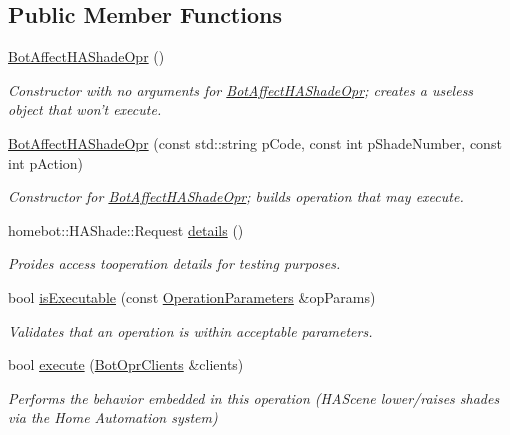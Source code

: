 \subsection*{Public Member Functions}
\begin{DoxyCompactItemize}
\item 
\hypertarget{classBotAffectHAShadeOpr_afb5fe3fd27fb2c560d880091418b753f}{\hyperlink{classBotAffectHAShadeOpr_afb5fe3fd27fb2c560d880091418b753f}{Bot\-Affect\-H\-A\-Shade\-Opr} ()}\label{classBotAffectHAShadeOpr_afb5fe3fd27fb2c560d880091418b753f}

\begin{DoxyCompactList}\small\item\em Constructor with no arguments for \hyperlink{classBotAffectHAShadeOpr}{Bot\-Affect\-H\-A\-Shade\-Opr}; creates a useless object that won't execute. \end{DoxyCompactList}\item 
\hyperlink{classBotAffectHAShadeOpr_a84f68ccbc995adb8bcb8bb06c2c615ee}{Bot\-Affect\-H\-A\-Shade\-Opr} (const std\-::string p\-Code, const int p\-Shade\-Number, const int p\-Action)
\begin{DoxyCompactList}\small\item\em Constructor for \hyperlink{classBotAffectHAShadeOpr}{Bot\-Affect\-H\-A\-Shade\-Opr}; builds operation that may execute. \end{DoxyCompactList}\item 
homebot\-::\-H\-A\-Shade\-::\-Request \hyperlink{classBotAffectHAShadeOpr_a45e3809806091e342492d66e8fade1a6}{details} ()
\begin{DoxyCompactList}\small\item\em Proides access tooperation details for testing purposes. \end{DoxyCompactList}\item 
bool \hyperlink{classBotAffectHAShadeOpr_af37862e410311c38fd41994c51138cf6}{is\-Executable} (const \hyperlink{classOperationParameters}{Operation\-Parameters} \&op\-Params)
\begin{DoxyCompactList}\small\item\em Validates that an operation is within acceptable parameters. \end{DoxyCompactList}\item 
bool \hyperlink{classBotAffectHAShadeOpr_aab37d71a095f66554ee9958057c71356}{execute} (\hyperlink{classBotOprClients}{Bot\-Opr\-Clients} \&clients)
\begin{DoxyCompactList}\small\item\em Performs the behavior embedded in this operation (H\-A\-Scene lower/raises shades via the Home Automation system) \end{DoxyCompactList}\end{DoxyCompactItemize}
